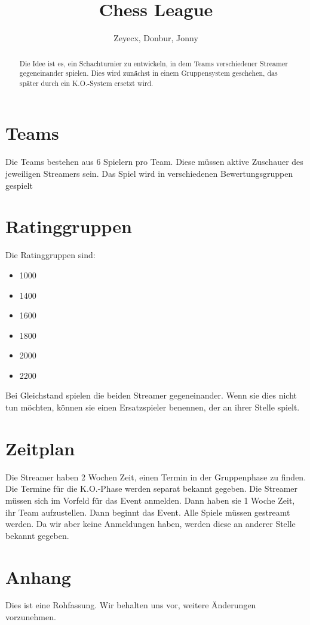 \documentclass[preprint,12pt]{elsarticle}
\begin{document}
	
\begin{frontmatter}
		
		
\title{Chess League}
		
\author{Zeyecx, Donbur, Jonny}
		
\address{German Paper}
	 
\begin{abstract}
	Die Idee ist es, ein Schachturnier zu entwickeln, in dem Teams verschiedener Streamer gegeneinander spielen.
	Dies wird zunächst in einem Gruppensystem geschehen, das später durch ein K.O.-System ersetzt wird. 
\end{abstract}
\end{frontmatter}
\linenumbers
\section{Teams}
Die Teams bestehen aus 6 Spielern pro Team. Diese müssen aktive Zuschauer des jeweiligen Streamers sein. 
Das Spiel wird in verschiedenen Bewertungsgruppen gespielt

\section{Ratinggruppen}

Die Ratinggruppen sind:
\begin{itemize}
	\item 1000
	\item 1400 
	\item 1600
	\item 1800
	\item 2000
	\item 2200
\end{itemize}
Bei Gleichstand spielen die beiden Streamer gegeneinander. Wenn sie dies nicht tun möchten, können sie einen Ersatzspieler benennen, der an ihrer Stelle spielt.

\section{Zeitplan}
Die Streamer haben 2 Wochen Zeit, einen Termin in der Gruppenphase zu finden. Die Termine für die K.O.-Phase werden separat bekannt gegeben.
Die Streamer müssen sich im Vorfeld für das Event anmelden. Dann haben sie 1 Woche Zeit, ihr Team aufzustellen.
Dann beginnt das Event.
Alle Spiele müssen gestreamt werden.
Da wir aber keine Anmeldungen haben, werden diese an anderer Stelle bekannt gegeben.

\section{Anhang}
Dies ist eine Rohfassung. Wir behalten uns vor, weitere Änderungen vorzunehmen.







	
\end{document}
